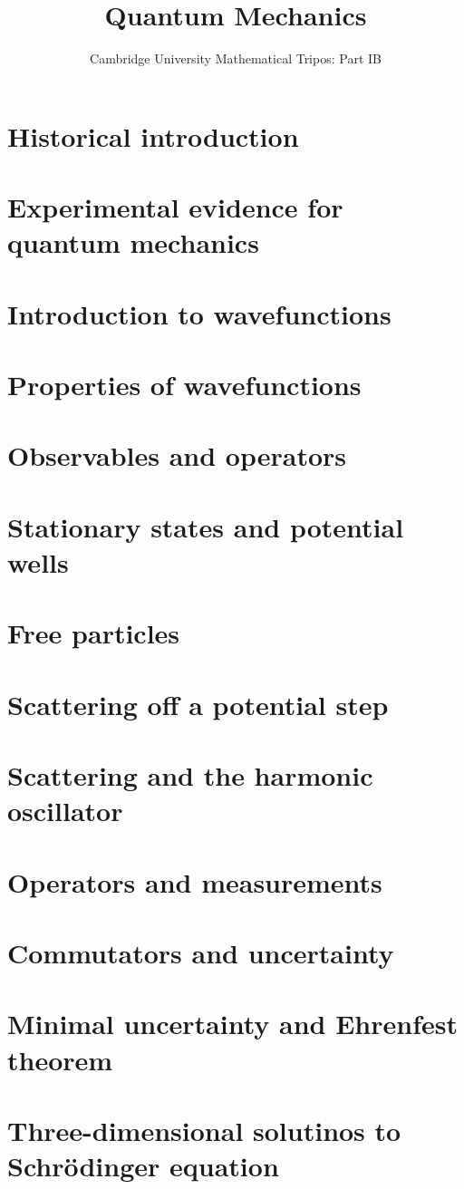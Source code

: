 \documentclass{article}
\title{Quantum Mechanics}
\author{Cambridge University Mathematical Tripos: Part IB}
\begin{document}
\maketitle

\tableofcontentsnewpage{}

\section{Historical introduction}

\section{Experimental evidence for quantum mechanics}

\section{Introduction to wavefunctions}

\section{Properties of wavefunctions}

\section{Observables and operators}

\section{Stationary states and potential wells}

\section{Free particles}

\section{Scattering off a potential step}

\section{Scattering and the harmonic oscillator}

\section{Operators and measurements}

\section{Commutators and uncertainty}

\section{Minimal uncertainty and Ehrenfest theorem}

\section{Three-dimensional solutinos to Schr\"odinger equation}

\end{document}
